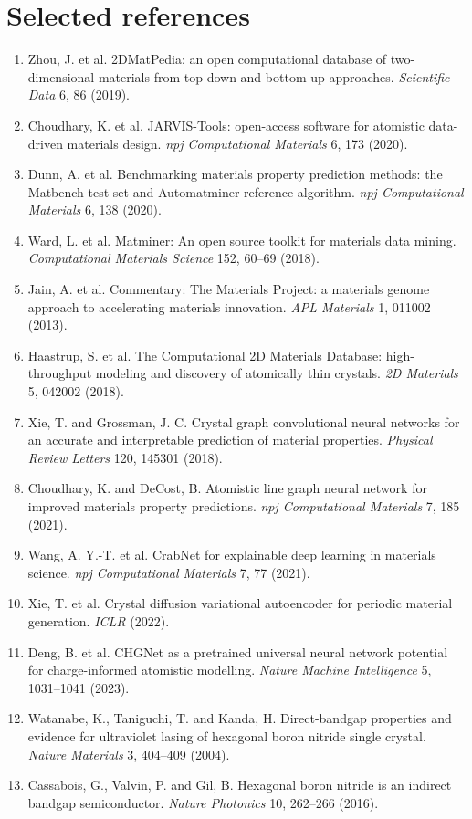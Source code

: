\documentclass[10pt]{article}
\begin{document}
\section*{Selected references}
\small
\begin{enumerate}[leftmargin=1.2em,itemsep=1pt]
  \item Zhou, J. et al. 2DMatPedia: an open computational database of two-dimensional materials from top-down and bottom-up approaches. \textit{Scientific Data} 6, 86 (2019).
  \item Choudhary, K. et al. JARVIS-Tools: open-access software for atomistic data-driven materials design. \textit{npj Computational Materials} 6, 173 (2020).
  \item Dunn, A. et al. Benchmarking materials property prediction methods: the Matbench test set and Automatminer reference algorithm. \textit{npj Computational Materials} 6, 138 (2020).
  \item Ward, L. et al. Matminer: An open source toolkit for materials data mining. \textit{Computational Materials Science} 152, 60--69 (2018).
  \item Jain, A. et al. Commentary: The Materials Project: a materials genome approach to accelerating materials innovation. \textit{APL Materials} 1, 011002 (2013).
  \item Haastrup, S. et al. The Computational 2D Materials Database: high-throughput modeling and discovery of atomically thin crystals. \textit{2D Materials} 5, 042002 (2018).
  \item Xie, T. and Grossman, J. C. Crystal graph convolutional neural networks for an accurate and interpretable prediction of material properties. \textit{Physical Review Letters} 120, 145301 (2018).
  \item Choudhary, K. and DeCost, B. Atomistic line graph neural network for improved materials property predictions. \textit{npj Computational Materials} 7, 185 (2021).
  \item Wang, A. Y.-T. et al. CrabNet for explainable deep learning in materials science. \textit{npj Computational Materials} 7, 77 (2021).
  \item Xie, T. et al. Crystal diffusion variational autoencoder for periodic material generation. \textit{ICLR} (2022).
  \item Deng, B. et al. CHGNet as a pretrained universal neural network potential for charge-informed atomistic modelling. \textit{Nature Machine Intelligence} 5, 1031--1041 (2023).
  \item Watanabe, K., Taniguchi, T. and Kanda, H. Direct-bandgap properties and evidence for ultraviolet lasing of hexagonal boron nitride single crystal. \textit{Nature Materials} 3, 404--409 (2004).
  \item Cassabois, G., Valvin, P. and Gil, B. Hexagonal boron nitride is an indirect bandgap semiconductor. \textit{Nature Photonics} 10, 262--266 (2016).
\end{enumerate}
\end{document}
